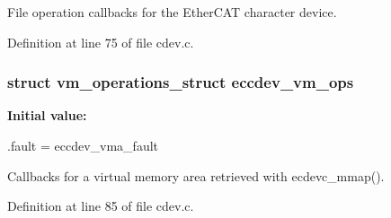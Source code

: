 \-File operation callbacks for the \-Ether\-C\-A\-T character device. 



\-Definition at line 75 of file cdev.\-c.

\subsubsection[{eccdev\-\_\-vm\-\_\-ops}]{\setlength{\rightskip}{0pt plus 5cm}struct vm\-\_\-operations\-\_\-struct {\bf eccdev\-\_\-vm\-\_\-ops}}\label{cdev_8c_ac0b3a174ec0e5531598931789b842ca0}
{\bfseries \-Initial value\-:}
\begin{DoxyCode}
 {

    .fault = eccdev_vma_fault



}
\end{DoxyCode}


\-Callbacks for a virtual memory area retrieved with ecdevc\-\_\-mmap(). 



\-Definition at line 85 of file cdev.\-c.

